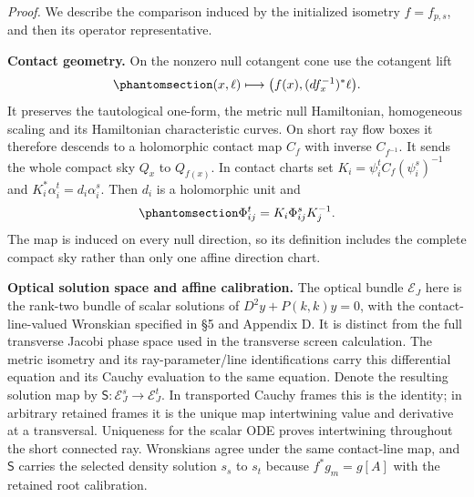 \documentclass[
  english,
  11pt,
  reqno]{amsart}
\begin{document}
\emph{Proof.} We describe the comparison induced by the initialized
isometry \(f=f_{p,s}\), and then its operator representative.

\textbf{Contact geometry.} On the nonzero null cotangent cone use the
cotangent lift
\begin{equation}\protect\phantomsection\label{eq:schw-bc-cotangent-map}{
 (x,\ell)\longmapsto
 \bigl(f(x),(df_x^{-1})^*\ell\bigr).
}\end{equation} It preserves the tautological one-form, the metric null
Hamiltonian, homogeneous scaling and its Hamiltonian characteristic
curves. On short ray flow boxes it therefore descends to a holomorphic
contact map \(C_f\) with inverse \(C_{f^{-1}}\). It sends the whole
compact sky \(Q_x\) to \(Q_{f(x)}\). In contact charts set
\(K_i=\psi_i^t C_f(\psi_i^s)^{-1}\) and
\(K_i^*\alpha_i^t=d_i\alpha_i^s\). Then \(d_i\) is a holomorphic unit
and
\begin{equation}\protect\phantomsection\label{eq:schw-bc-contact-comparison}{
 \Phi^t_{ij}=K_i\Phi^s_{ij}K_j^{-1}.
}\end{equation} The map is induced on every null direction, so its
definition includes the complete compact sky rather than only one affine
direction chart.

\textbf{Optical solution space and affine calibration.} The optical
bundle \(\mathcal E_J\) here is the rank-two bundle of scalar solutions
of \(D^2y+P(k,k)y=0\), with the contact-line-valued Wronskian specified
in §5 and Appendix D. It is distinct from the full transverse Jacobi
phase space used in the transverse screen calculation. The metric
isometry and its ray-parameter/line identifications carry this
differential equation and its Cauchy evaluation to the same equation.
Denote the resulting solution map by
\(\mathsf S:\mathcal E_J^s\to\mathcal E_J^t\). In transported Cauchy
frames this is the identity; in arbitrary retained frames it is the
unique map intertwining value and derivative at a transversal.
Uniqueness for the scalar ODE proves intertwining throughout the short
connected ray. Wronskians agree under the same contact-line map, and
\(\mathsf S\) carries the selected density solution \(s_s\) to \(s_t\)
because \(f^*g_m=g[A]\) with the retained root calibration.
\end{document}

